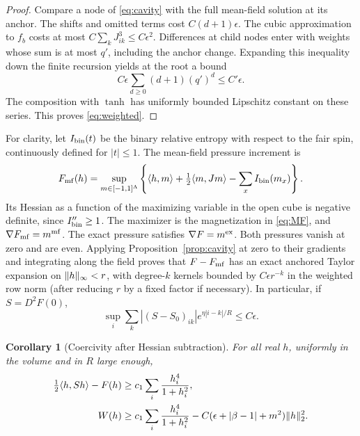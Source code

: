 \documentclass[11pt]{article}
\newtheorem{corollary}[proposition]{Corollary}
\DeclarePairedDelimiter{\norm}{\lVert}{\rVert}
\begin{document}
\begin{proof}
Compare a node of \eqref{eq:cavity} with the full mean-field solution
at its anchor. The shifts and omitted terms cost
\(C(d+1)\epsilon\). The cubic approximation to \(f_b\) costs at most
\(C\sum_k J_{ik}^3\le C\epsilon^2\). Differences at child nodes enter
with weights whose sum is at most \(q'\), including the anchor change.
Expanding this inequality down the finite recursion yields at the
root a bound
\[
 C\epsilon\sum_{d\ge0}(d+1)(q')^d\le C'\epsilon.
\]
The composition with \(\tanh\) has uniformly bounded Lipschitz constant
on these series. This proves \eqref{eq:weighted}.
\end{proof}

For clarity, let \(I_{\rm bin}(t)\) be the binary relative entropy with
respect to the fair spin, continuously defined for \(|t|\le1\).
The mean-field pressure increment is
\[
 F_{\rm mf}(h)=
 \sup_{m\in[-1,1]^\Lambda}
 \left\{\langle h,m\rangle+\tfrac12\langle m,Jm\rangle
                  -\sum_x I_{\rm bin}(m_x)\right\}.
\]
Its Hessian as a function of the maximizing variable in the open
cube is negative definite, since \(I_{\rm bin}''\ge1\).
The maximizer is the magnetization in \eqref{eq:MF}, and
\(\nabla F_{\rm mf}=m^{\rm mf}\). The exact pressure satisfies
\(\nabla F=m^{\rm ex}\). Both pressures vanish at zero and are even.
Applying Proposition~\ref{prop:cavity} at zero to their gradients
and integrating along the field proves that \(F-F_{\rm mf}\) has an
exact anchored Taylor expansion on \(\norm h_\infty<r\), with
degree-\(k\) kernels bounded by \(C\epsilon r^{-k}\) in the weighted
row norm (after reducing \(r\) by a fixed factor if necessary).
In particular, if \(S=D^2F(0)\),
\begin{equation}\label{eq:sus}
 \sup_i\sum_k |(S-S_0)_{ik}|e^{\eta|i-k|/R}
 \le C\epsilon .
\end{equation}

\begin{corollary}[Coercivity after Hessian subtraction]\label{cor:stable}
For all real \(h\), uniformly in the volume and in \(R\) large enough,
\begin{align}
 \tfrac12\langle h,Sh\rangle-F(h)
   &\ge c_1\sum_i\frac{h_i^4}{1+h_i^2},\\
 W(h)&\ge c_1\sum_i\frac{h_i^4}{1+h_i^2}
       - C(\epsilon+|\beta-1|+m^2)\norm h_2^2 .
       \label{eq:stabilityW}
\end{align}
\end{corollary}
\end{document}
